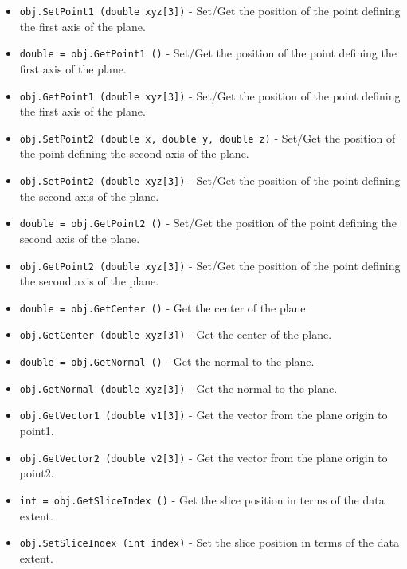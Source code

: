 \begin{itemize}
\item  \verb|obj.SetPoint1 (double xyz[3])| -  Set/Get the position of the point defining the first axis of the plane.

\item  \verb|double = obj.GetPoint1 ()| -  Set/Get the position of the point defining the first axis of the plane.

\item  \verb|obj.GetPoint1 (double xyz[3])| -  Set/Get the position of the point defining the first axis of the plane.

\item  \verb|obj.SetPoint2 (double x, double y, double z)| -  Set/Get the position of the point defining the second axis of the plane.

\item  \verb|obj.SetPoint2 (double xyz[3])| -  Set/Get the position of the point defining the second axis of the plane.

\item  \verb|double = obj.GetPoint2 ()| -  Set/Get the position of the point defining the second axis of the plane.

\item  \verb|obj.GetPoint2 (double xyz[3])| -  Set/Get the position of the point defining the second axis of the plane.

\item  \verb|double = obj.GetCenter ()| -  Get the center of the plane.

\item  \verb|obj.GetCenter (double xyz[3])| -  Get the center of the plane.

\item  \verb|double = obj.GetNormal ()| -  Get the normal to the plane.

\item  \verb|obj.GetNormal (double xyz[3])| -  Get the normal to the plane.

\item  \verb|obj.GetVector1 (double v1[3])| -  Get the vector from the plane origin to point1.

\item  \verb|obj.GetVector2 (double v2[3])| -  Get the vector from the plane origin to point2.

\item  \verb|int = obj.GetSliceIndex ()| -  Get the slice position in terms of the data extent.

\item  \verb|obj.SetSliceIndex (int index)| -  Set the slice position in terms of the data extent.


\end{itemize}
